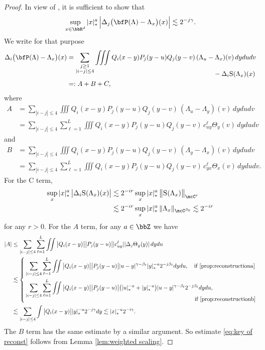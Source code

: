 \begin{proof}
In view of \cite[Prop.\,9]{BH}, it is sufficient to show that
\begin{align}\label{eq:key of reconst}
\sup_{x\in\bbR^d}|x|_*^a\,\Big|\Delta_j\bigl(\bfP(\Lambda)-\Lambda_x\bigr)(x)\Big| \lesssim 2^{-j\gamma}.
\end{align}
We write for that purpose
\begin{align*}
\Delta_i\bigl(\bfP(\Lambda)-\Lambda_x\bigr)(x)&=\sum_{\substack{j\ge1\\ |i-j|\le4}}\iiint Q_i(x-y)P_j(y-u)Q_j(y-v)\,(\Lambda_u-\Lambda_x)(v)\,dydudv\\[-10pt]
& \hspace*{7.8cm}- \Delta_i\textsc{S}(\Lambda_x)(x)\\
&=:A+B+C,
\end{align*}
where
\begin{align*}
A
&=\sum_{|i-j|\le4}\iiint Q_i(x-y)P_j(y-u)Q_j(y-v)\,(\Lambda_u-\Lambda_y)(v)\,dydudv\\
&=\sum_{|i-j|\le4}\sum_{\ell=1}^L \iiint Q_i(x-y)P_j(y-u)Q_j(y-v)\,c_{uy}^\ell\Theta_y(v)\,dydudv
\end{align*}
and
\begin{align*}
B
&=\sum_{|i-j|\le4}\iiint Q_i(x-y)P_j(y-u)Q_j(y-v)\,(\Lambda_y-\Lambda_x)(v)\,dydudv\\
&=\sum_{|i-j|\le4}\sum_{\ell=1}^L \iiint Q_i(x-y)P_j(y-u)Q_j(y-v)\,c_{yx}^\ell\Theta_x(v)\,dydudv.
\end{align*}
For the C term,
\begin{align*}
\sup_x|x|_*^a\,\big|\Delta_i\textsc{S}(\Lambda_x)(x)\big| &\lesssim2^{-ir}\sup_x|x|_*^a\,\big\|\textsc{S}(\Lambda_x)\big\|_{\mcC^r} \\
&\lesssim 2^{-ir}\sup_x|x|_*^a\,\|\Lambda_x\|_{\mcC^{\beta_0}}\lesssim2^{-ir}
\end{align*}
for any $r>0$. For the $A$ term, for any $a\in\bbZ$ we have
\begin{align*}
|A|&
\le\sum_{|i-j|\le4}\sum_{\ell=1}^L \iint \big|Q_i(x-y)\big| \big|P_j(y-u)\big| |c_{uy}^\ell| |\Delta_j\Theta_y(y)|\,dydu\\
&\lesssim
\left\{
\begin{aligned}
&\sum_{|i-j|\le4}\sum_{\ell=1}^L \iint \big|Q_i(x-y)\big| \big|P_j(y-u)\big|
|u-y|^{\gamma-\beta_\ell}|y|_*^{-a}2^{-j\beta_\ell} dydu,\quad\text{if \eqref{prop:reconstructiona}}\\
&\sum_{|i-j|\le4}\sum_{\ell=1}^L \iint \big|Q_i(x-y)\big| \big|P_j(y-u)\big|
\bigl(|u|_*^{-a}+|y|_*^{-a}\bigr)|u-y|^{\gamma-\beta_\ell}2^{-j\beta_\ell} dydu,\\[-8pt]
&\hspace*{10.3cm}\text{if \eqref{prop:reconstructionb}}
\end{aligned}
\right.\\
&\lesssim\sum_{|i-j|\le4}
\int\big|Q_i(x-y)\big||y|_*^{-a}2^{-j\gamma}dy
\lesssim |x|_*^{-a}2^{-i\gamma}.
\end{align*}
The $B$ term has the same estimate by a similar argument. So estimate \eqref{eq:key of reconst} follows from Lemma \ref{lem:weighted scaling}.


\end{proof}
